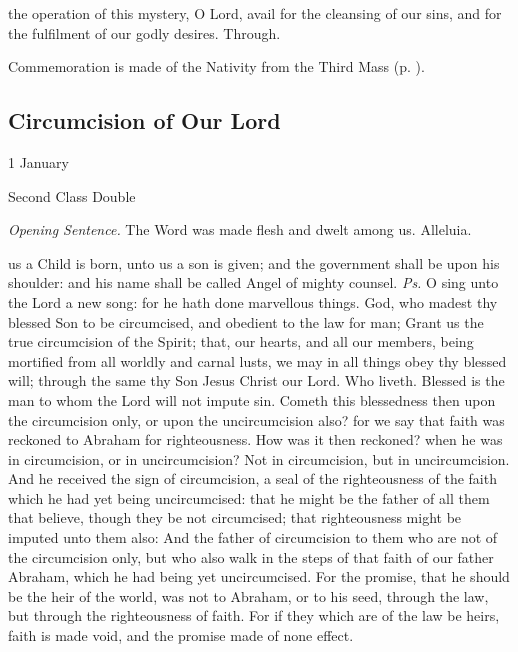  the operation of this mystery, O Lord, avail for the cleansing of our sins, and for the fulfilment of our godly desires. Through.

\vspace{0.5\baselineskip}

\begin{rubric}
    Commemoration is made of the Nativity from the Third Mass (p. \pageref{NativityMassIIIPostcommunion}).
\end{rubric}


\clearpage
\subsection{Circumcision of Our Lord}
\begin{inhead}
{1 January}\par
{Second Class Double}
\end{inhead}
\par\noindent
\textit{Opening Sentence.} The Word was made flesh and dwelt among us. Alleluia.


\introit
{} us a Child is born, unto us a son is given; and the government shall be upon his shoulder: and his name shall be called Angel of mighty counsel. \textit{Ps.} O sing unto the Lord a new song: for he hath done marvellous things.
\collect
{} God, who madest thy blessed Son to be circumcised, and obedient to the law for man; Grant us the true circumcision of the Spirit; that, our hearts, and all our members, being mortified from all worldly and carnal lusts, we may in all things obey thy blessed will; through the same thy Son Jesus Christ our Lord. Who liveth.
 Blessed is the man to whom the Lord will not impute sin. Cometh this blessedness then upon the circumcision only, or upon the uncircumcision also? for we say that faith was reckoned to Abraham for righteousness. How was it then reckoned? when he was in circumcision, or in uncircumcision? Not in circumcision, but in uncircumcision. And he received the sign of circumcision, a seal of the righteousness of the faith which he had yet being uncircumcised: that he might be the father of all them that believe, though they be not circumcised; that righteousness might be imputed unto them also: And the father of circumcision to them who are not of the circumcision only, but who also walk in the steps of that faith of our father Abraham, which he had being yet uncircumcised. For the promise, that he should be the heir of the world, was not to Abraham, or to his seed, through the law, but through the righteousness of faith. For if they which are of the law be heirs, faith is made void, and the promise made of none effect.

